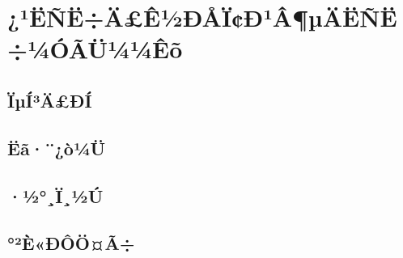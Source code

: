 
\chapter{¿¹ËÑË÷Ä£Ê½ÐÅÏ¢Ð¹Â¶µÄËÑË÷¼ÓÃÜ¼¼Êõ}
\label{chap:searchpatttern}


\section{ÏµÍ³Ä£ÐÍ}
\label{sec:searchpatttern_model}

\section{Ëã·¨¿ò¼Ü}
\label{sec:searchpatttern_algo}


\section{·½°¸Ï¸½Ú}
\label{sec:searchpatttern_scheme}


\section{°²È«ÐÔÖ¤Ã÷}
\label{sec:searchpatttern_security}
